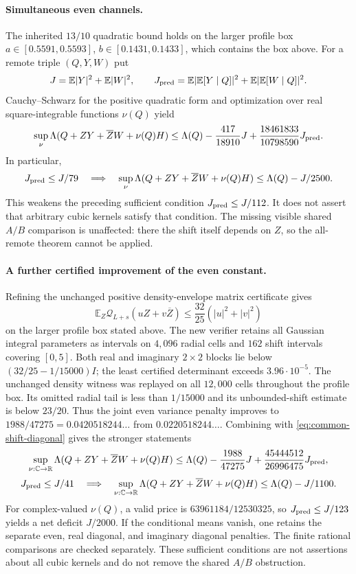 \paragraph{Simultaneous even channels.}
The inherited $13/10$ quadratic bound holds on the larger profile box
$a\in[0.5591,0.5593]$, $b\in[0.1431,0.1433]$, which contains the box above.
For a remote triple $(Q,Y,W)$ put
\[
 J=\mathbb E|Y|^2+\mathbb E|W|^2,
 \qquad J_{\rm pred}=\mathbb E|\mathbb E[Y\mid Q]|^2+
                         \mathbb E|\mathbb E[W\mid Q]|^2.
\]
Cauchy--Schwarz for the positive quadratic form and optimization over real
square-integrable functions $\nu(Q)$ yield
\[
 \sup_\nu\Lambda(Q+ZY+\overline ZW+\nu(Q)H)
 \le\Lambda(Q)-\frac{417}{18910}J
 +\frac{18461833}{10798590}J_{\rm pred}.
\]
In particular,
\[
 J_{\rm pred}\le J/79
 \quad\Longrightarrow\quad
 \sup_\nu\Lambda(Q+ZY+\overline ZW+\nu(Q)H)
 \le\Lambda(Q)-J/2500.
\]
This weakens the preceding sufficient condition $J_{\rm pred}\le J/112$.
It does not assert that arbitrary cubic kernels satisfy that condition.
The missing visible shared $A/B$ comparison is unaffected: there the shift
itself depends on $Z$, so the all-remote theorem cannot be applied.

\paragraph{A further certified improvement of the even constant.}
Refining the unchanged positive density-envelope matrix certificate gives
\[
 \mathbb E_Z\mathcal Q_{L+s}(uZ+v\overline Z)
 \le\frac{32}{25}(|u|^2+|v|^2)
\]
on the larger profile box stated above. The new verifier retains all
Gaussian integral parameters as intervals on $4{,}096$ radial cells and
$162$ shift intervals covering $[0,5]$. Both real and imaginary $2\times2$
blocks lie below $(32/25-1/15000)I$; the least certified determinant exceeds
$3.96\cdot10^{-5}$. The unchanged density witness was replayed on all
$12{,}000$ cells throughout the profile box. Its omitted radial tail is
less than $1/15000$ and its unbounded-shift estimate is below $23/20$.
Thus the joint even variance penalty improves to
$1988/47275=0.0420518244\ldots$ from $0.0220518244\ldots$.
Combining with \eqref{eq:common-shift-diagonal} gives the stronger statements
\[
 \sup_{\nu:\mathbb C\to\mathbb R}\Lambda(Q+ZY+\overline ZW+\nu(Q)H)
 \le\Lambda(Q)-\frac{1988}{47275}J
       +\frac{45444512}{26996475}J_{\rm pred},
\]
\[
 J_{\rm pred}\le J/41\quad\Longrightarrow\quad
 \sup_{\nu:\mathbb C\to\mathbb R}\Lambda(Q+ZY+\overline ZW+\nu(Q)H)
 \le\Lambda(Q)-J/1100.
\]
For complex-valued $\nu(Q)$, a valid price is $63961184/12530325$, so
$J_{\rm pred}\le J/123$ yields a net deficit $J/2000$.
If the conditional means vanish, one retains the separate even, real
 diagonal, and imaginary diagonal penalties. The finite rational comparisons
are checked separately. These sufficient conditions are not assertions
about all cubic kernels and do not remove the shared $A/B$ obstruction.


